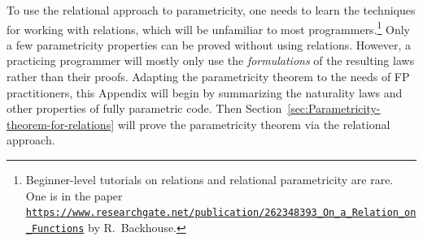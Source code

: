 To use the relational approach to parametricity, one needs to learn
the techniques for working with relations, which will be unfamiliar
to most programmers.\footnote{Beginner-level tutorials on relations and relational parametricity
are rare. One is in the paper \texttt{\href{https://www.researchgate.net/publication/262348393_On_a_Relation_on_Functions}{https://www.researchgate.net/publication/262348393\_On\_a\_Relation\_on\_Functions}}
 by R.~Backhouse.} Only a few parametricity properties can be proved without using relations.
However, a practicing programmer will mostly only use the \emph{formulations}
of the resulting laws rather than their proofs. Adapting the parametricity
theorem to the needs of FP practitioners, this Appendix will begin
by summarizing the naturality laws and other properties of fully parametric
code. Then Section~\ref{sec:Parametricity-theorem-for-relations}
will prove the parametricity theorem via the relational approach.%

